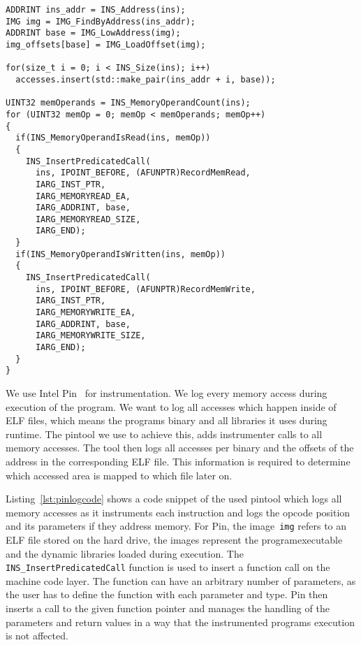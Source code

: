 \begin{minipage}{\linewidth}
\begin{lstlisting}[style=CStyle,
                   caption={Example C++ code for a pintool logging memory
accesses. The tool stores the locations of instructions and parameters if they
point to memory. The tool stores accesses for reading and writing seperately.},
                   label={lst:pinlogcode}]
ADDRINT ins_addr = INS_Address(ins);
IMG img = IMG_FindByAddress(ins_addr);
ADDRINT base = IMG_LowAddress(img);
img_offsets[base] = IMG_LoadOffset(img);

for(size_t i = 0; i < INS_Size(ins); i++)
  accesses.insert(std::make_pair(ins_addr + i, base));

UINT32 memOperands = INS_MemoryOperandCount(ins);
for (UINT32 memOp = 0; memOp < memOperands; memOp++)
{
  if(INS_MemoryOperandIsRead(ins, memOp))
  {
    INS_InsertPredicatedCall(
      ins, IPOINT_BEFORE, (AFUNPTR)RecordMemRead,
      IARG_INST_PTR,
      IARG_MEMORYREAD_EA,
      IARG_ADDRINT, base,
      IARG_MEMORYREAD_SIZE,
      IARG_END);
  }
  if(INS_MemoryOperandIsWritten(ins, memOp))
  {
    INS_InsertPredicatedCall(
      ins, IPOINT_BEFORE, (AFUNPTR)RecordMemWrite,
      IARG_INST_PTR,
      IARG_MEMORYWRITE_EA,
      IARG_ADDRINT, base,
      IARG_MEMORYWRITE_SIZE,
      IARG_END);
  }
}
\end{lstlisting}
\end{minipage}

We use Intel Pin~\cite{pintool} for instrumentation. We log every memory access
during execution of the program. We want to log all accesses which happen inside
of ELF files, which means the program\textquotesingle s binary and all libraries
it uses during runtime. The pintool we use to achieve this, adds instrumenter
calls to all memory accesses. The tool then logs all accesses per binary and the
offsets of the address in the corresponding ELF file. This information is
required to determine which accessed area is mapped to which file later on.

Listing~\ref{lst:pinlogcode} shows a code snippet of the used pintool which
logs all memory accesses as it instruments each instruction and logs the opcode
position and its parameters if they address memory. For Pin, the
image~\texttt{img} refers to an ELF file stored on the hard drive, the images
represent the program\textquotesingle executable and the dynamic libraries
loaded during execution. The \texttt{INS\_InsertPredicatedCall} function is used
to insert a function call on the machine code layer. The function can have an
arbitrary number of parameters, as the user has to define the function with each
parameter and type. Pin then inserts a call to the given function pointer and
manages the handling of the parameters and return values in a way that the
instrumented program\textquotesingle s execution is not affected.

